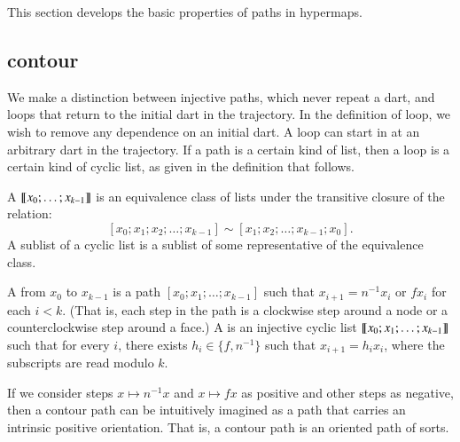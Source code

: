 This section develops the basic properties of paths in hypermaps.


\subsection{contour}

We make a distinction between injective paths, which never
repeat a dart, and loops that return to the initial dart in the trajectory.
In the definition of loop, we wish to remove any dependence on an initial dart.
A loop can start in at an arbitrary dart in the trajectory.  If a path is a certain
kind of list, then a loop is a certain kind of cyclic list, as given in the
definition that follows.

\begin{definition}\label{def:cyclic:list}
   
  A  ${\llbracket{x_0;\ldots;x_{k-1}}\rrbracket}$ is an equivalence
  class of lists under the transitive closure of the relation:
\[ 
[x_0;x_1;x_2;\ldots;x_{k-1}] \sim [x_1;x_2;\ldots;x_{k-1};x_0].
\] 
A sublist of a cyclic list is a sublist of some representative of the
equivalence class.
\end{definition}

\begin{definition}
 A  from
$x_0$ to $x_{k-1}$ is a path $[x_0;x_1;\ldots;x_{k-1}]$ such that
$x_{i+1} = n^{-1} x_i$ or $f x_i$ for each $i<k$.  (That is, each
step in the path is a clockwise step around a node or a
counterclockwise step around a face.)  
A  is an injective cyclic list
${\llbracket{x_0;x_1;\ldots;x_{k-1}}\rrbracket}$ such that
for every $i$, there exists $h_i\in \{f,n^{-1}\}$ such that $x_{i+1} = h_i x_i$, 
where the subscripts are
read modulo $k$.
%
%
%
\end{definition}


If we consider steps $x\mapsto n^{-1} x$ and $x\mapsto f x $ as
positive and other steps as negative, then a contour path can be
intuitively imagined as a path that carries an intrinsic positive
orientation.  That is, a contour path is an oriented path of sorts.



